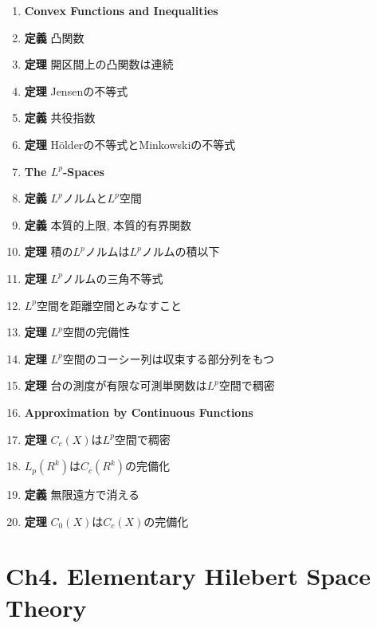\documentclass[a4paper,18pt]{jsarticle}
\begin{document}
\begin{enumerate}
  \item[] \hspace{-8mm}\textbf{Convex Functions and Inequalities}
  \item \textbf{定義} 凸関数
  \item \textbf{定理} 開区間上の凸関数は連続
  \item \textbf{定理} Jensenの不等式
  \item \textbf{定義} 共役指数
  \item \textbf{定理} Hölderの不等式とMinkowskiの不等式
  \item[] \hspace{-8mm}\textbf{The $L^p$-Spaces}
  \item \textbf{定義} $L^p$ノルムと$L^p$空間
  \item \textbf{定義} 本質的上限, 本質的有界関数
  \item \textbf{定理} 積の$L^p$ノルムは$L^p$ノルムの積以下
  \item \textbf{定理} $L^p$ノルムの三角不等式
  \item $L^p$空間を距離空間とみなすこと
  \item \textbf{定理} $L^p$空間の完備性
  \item \textbf{定理} $L^p$空間のコーシー列は収束する部分列をもつ
  \item \textbf{定理} 台の測度が有限な可測単関数は$L^p$空間で稠密
  \item[] \hspace{-8mm}\textbf{Approximation by Continuous Functions}
  \item \textbf{定理} $C_c(X)$は$L^p$空間で稠密
  \item $L_p(R^k)$は$C_c(R^k)$の完備化
  \item \textbf{定義} 無限遠方で消える
  \item \textbf{定理} $C_0(X)$は$C_c(X)$の完備化
\end{enumerate}


\section*{Ch4. Elementary Hilebert Space Theory}
\end{document}
